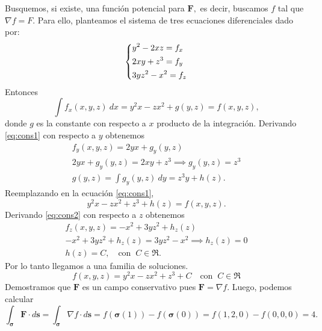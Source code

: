 
\begin{solution}
Busquemos, si existe,  una funci\'on potencial para $\mathbf{F},$ es decir, buscamos $f$ tal que $\nabla f = F.$ Para ello,  planteamos el sistema de tres ecuaciones diferenciales dado por:
\[\begin{dcases}
        y^2-2xz=f_x \\
        2xy+z^3=f_y \\
        3yz^2-x^2=f_z
    \end{dcases}\]
Entonces
\begin{equation}
    \int f_x(x,y,z)\:dx=y^2x-zx^2+g(y,z)=f(x,y,z), \label{eq:cons1}
\end{equation}
donde $g$ es la constante con respecto a $x$ producto de la integraci\'on. Derivando \eqref{eq:cons1} con respecto a $y$ obtenemos
\begin{gather*}
    f_y(x,y,z)= 2yx+g_y(y,z)\\[.2cm]
    2yx+g_y(y,z)  = 2xy+z^3 \implies g_y(y,z)=z^3\\[.2cm]
    g(y,z)=\int  g_y(y,z) \:dy =  z^3y+h(z).
\end{gather*}
Reemplazando en  la ecuaci\'on \eqref{eq:cons1},
\begin{equation}
y^2x-zx^2+z^3+h(z) =  f(x,y,z).   \label{eq:cons2}
\end{equation}
Derivando \eqref{eq:cons2} con respecto a $z$ obtenemos
\begin{gather*}
    f_z(x,y,z)=-x^2+3yz^2+h_z(z)\\
    -x^2+3yz^2+h_z(z)=3yz^2-x^2   \implies h_z(z) =0 \\[.2cm]
    h(z) = C,\quad\text{con}\;\;C\in\Re.
\end{gather*}
Por lo tanto llegamos a una familia de soluciones.
\[
    f(x,y,z)=y^2x-zx^2+z^3+C  \quad\text{con}\;\;C\in\Re
\]
Demostramos que $\mathbf{F}$ es un campo conservativo pues $\mathbf{F}=\nabla f.$ Luego, podemos calcular
\[
    \int _{\boldsymbol{\sigma}} \mathbf{F}\cdot d\mathbf{s}=
    \int _{\boldsymbol{\sigma}} \nabla f\cdot d\mathbf{s} = f(\boldsymbol{\sigma}(1))-f(\boldsymbol{\sigma}(0))=f(1,2,0)-f(0,0,0)=4.
\]
\end{solution}


